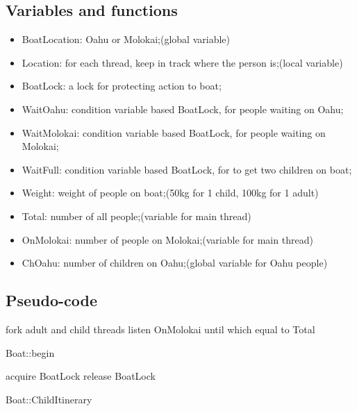 \documentclass[a4paper,10pt]{article}
\begin{document}
\subsection{Variables and functions}
\begin{itemize}
\item BoatLocation: Oahu or Molokai;(global variable)
\item Location: for each thread, keep in track where the person is;(local variable)
\item BoatLock: a lock for protecting action to boat;
\item WaitOahu: condition variable based BoatLock, for people waiting on Oahu;
\item WaitMolokai: condition variable based BoatLock, for people waiting on Molokai;
\item WaitFull: condition variable based BoatLock, for to get two children on boat;
\item Weight: weight of people on boat;(50kg for 1 child, 100kg for 1 adult)
\item Total: number of all people;(variable for main thread)
\item OnMolokai: number of people on Molokai;(variable for main thread)
\item ChOahu: number of children on Oahu;(global variable for Oahu people)
\end{itemize}
\subsection {Pseudo-code}
\begin{algorithm}
\DontPrintSemicolon %
fork adult and child threads\;
listen OnMolokai until which equal to Total\;
\caption{Boat::begin}
\label{algo:change}
\end{algorithm}
\begin{algorithm}
\DontPrintSemicolon %
acquire BoatLock\;
release BoatLock\;
\caption{Boat::ChildItinerary}
\label{algo:change}
\end{algorithm}
\end{document}
